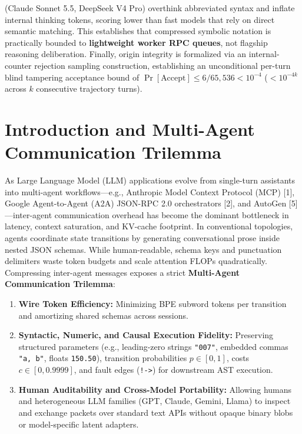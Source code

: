 \documentclass[9pt,a4paper]{extarticle}
\begin{document}
{\begin{minipage}{\dimexpr\textwidth-2\fboxsep-2\fboxrule\relax}
{(Claude Sonnet 5.5, DeepSeek V4 Pro) overthink abbreviated syntax and inflate internal thinking tokens, scoring lower than fast models that rely on direct semantic matching. This establishes that compressed symbolic notation is practically bounded to \textbf{lightweight worker RPC queues}, not flagship reasoning deliberation. Finally, origin integrity is formalized via an internal-counter rejection sampling construction, establishing an unconditional per-turn blind tampering acceptance bound of $\Pr[\text{Accept}] \le 6/65{,}536 < 10^{-4}$ ($< 10^{-4k}$ across $k$ consecutive trajectory turns).
}
\vspace{1.0pt}
\end{minipage}%
}

\section{Introduction and Multi-Agent Communication Trilemma}
As Large Language Model (LLM) applications evolve from single-turn assistants into multi-agent workflows---e.g., Anthropic Model Context Protocol (MCP) [1], Google Agent-to-Agent (A2A) JSON-RPC 2.0 orchestrators [2], and AutoGen [5]---inter-agent communication overhead has become the dominant bottleneck in latency, context saturation, and KV-cache footprint. In conventional topologies, agents coordinate state transitions by generating conversational prose inside nested JSON schemas. While human-readable, schema keys and punctuation delimiters waste token budgets and scale attention FLOPs quadratically. Compressing inter-agent messages exposes a strict \textbf{Multi-Agent Communication Trilemma}:
\begin{enumerate}
  \item \textbf{Wire Token Efficiency:} Minimizing BPE subword tokens per transition and amortizing shared schemas across sessions.
  \item \textbf{Syntactic, Numeric, and Causal Execution Fidelity:} Preserving structured parameters (e.g., leading-zero strings \texttt{"007"}, embedded commas \texttt{"a, b"}, floats \texttt{150.50}), transition probabilities $p \in [0,1]$, costs $c \in [0, 0.9999]$, and fault edges (\texttt{!->}) for downstream AST execution.
  \item \textbf{Human Auditability and Cross-Model Portability:} Allowing humans and heterogeneous LLM families (GPT, Claude, Gemini, Llama) to inspect and exchange packets over standard text APIs without opaque binary blobs or model-specific latent adapters.
\end{enumerate}
\end{document}

